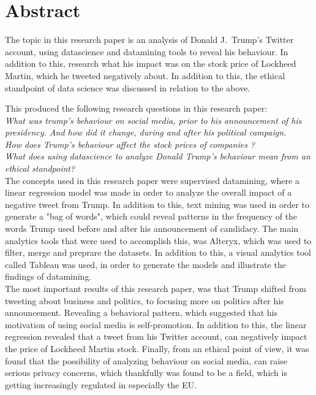 \documentclass[12pt]{article}
\begin{document}
\color{NavyBlue} \tableofcontents \color{black}
\thispagestyle{empty} %
 \cleardoublepage
\setcounter{page}{1}%


\cleardoublepage%


\section{Abstract} %
The topic in this research paper is an analysis of Donald J.\ Trump's Twitter account, using datascience and datamining tools to reveal his behaviour. In addition to this, research what his impact was on the stock price of Lockheed Martin, which he tweeted negatively about. In addition to this, the ethical standpoint of data science was discussed in relation to the above.\

This produced the following research questions in this research paper:  \\

\textit{What was trump's behaviour on social media, prior to his announcement of his presidency. And how did it change, during and after his political campaign.}\\

\textit{How does Trump's behaviour affect the stock prices of companies ?} \\




\textit{What does using datascience to analyze Donald Trump's behaviour mean from an ethical standpoint?}\\
 
The concepts used in this research paper were supervised datamining, where a linear regression model was made in order to analyze the overall impact of a negative tweet from Trump. In addition to this, text mining was used in order to generate a "bag of words", which could reveal patterns in the frequency of the words Trump used before and after his announcement of candidacy. The main analytics tools that were used to accomplish this, was Alteryx, which was used to filter, merge and preprare the datasets. In addition to this, a visual analytics tool called Tableau was used, in order to generate the models and illustrate the findings of datamining. \\

The most important results of this research paper, was that Trump shifted from tweeting about business and politics, to focusing more on politics after his announcement. Revealing a behavioral pattern, which suggested that his motivation of using social media is self-promotion. In addition to this, the linear regression revealed that a tweet from his Twitter account, can negatively impact the price of Lockheed Martin stock. Finally, from an ethical point of view, it was found that the possibility of analyzing behaviour on social media, can raise serious privacy concerns, which thankfully was found to be a field, which is getting increasingly regulated in especially the EU.
 
\end{document}
